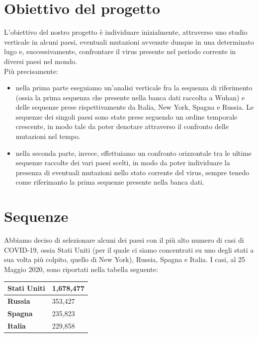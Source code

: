 \documentclass[a4paper,10pt]{article}
\begin{document}
\newpage

\section{Obiettivo del progetto}
L'obiettivo del nostro progetto è individuare inizialmente, attraverso uno studio verticale in alcuni paesi, eventuali mutazioni avvenute dunque in una determinato lugo e, successivamente, confrontare il virus presente nel periodo corrente in diversi paesi nel mondo. \\
Più precisamente: %
\begin{itemize}
\item nella prima parte eseguiamo un'analisi verticale fra la sequenza di riferimento (ossia la prima sequenza che presente nella banca dati raccolta a Wuhan) e delle sequenze prese rispettivamente da Italia, New York, Spagna e Russia. Le sequenze dei singoli paesi sono state prese seguendo un ordine temporale crescente, in modo tale da poter denotare attraverso il confronto delle mutazioni nel tempo.
\item nella seconda parte, invece, effettuiamo un confronto orizzontale tra le ultime sequenze raccolte dei vari paesi scelti, in modo da poter individuare la presenza di eventuali mutazioni nello stato corrente del virus, sempre tenedo come riferimanto la prima sequenze presente nella banca dati. 
\end{itemize}

\section{Sequenze}
Abbiamo deciso di selezionare alcuni dei paesi con il più alto numero di casi di COVID-19, ossia Stati Uniti (per il quale ci siamo concentrati su uno degli stati a sua volta più colpito, quello di New York), Russia,  Spagna e Italia. I casi, al 25 Maggio 2020, sono riportati nella tabella seguente:

\begin{table}[H]
\centering
\begin{tabular}{|l|l|}
\hline
\textbf{Stati Uniti} & 1,678,477 \\ \hline
\textbf{Russia}      & 353,427   \\ \hline
\textbf{Spagna}      & 235,823   \\ \hline
\textbf{Italia}      & 229,858   \\ \hline
\end{tabular}
\end{table}
\end{document}
